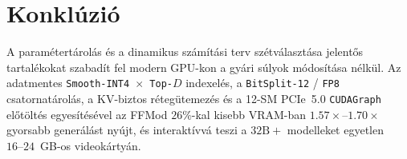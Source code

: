 \documentclass[10pt,twocolumn]{article}
\begin{document}
\section{Konklúzió}
A paramétertárolás és a dinamikus számítási terv szétválasztása jelentős tartalékokat szabadít fel modern GPU-kon a gyári súlyok módosítása nélkül. Az adatmentes \texttt{Smooth-INT4 $\times$ Top-$D$} indexelés, a \texttt{BitSplit-12} / \texttt{FP8} csatornatárolás, a KV-biztos rétegütemezés és a 12-SM PCIe~5.0 \texttt{CUDAGraph} előtöltés egyesítésével az FFMod $26\%$-kal kisebb VRAM-ban $1.57\times\text{--}1.70\times$ gyorsabb generálást nyújt, és interaktívvá teszi a $32\text{B}+$ modelleket egyetlen $16\text{--}24$~GB-os videokártyán.



\end{document}
